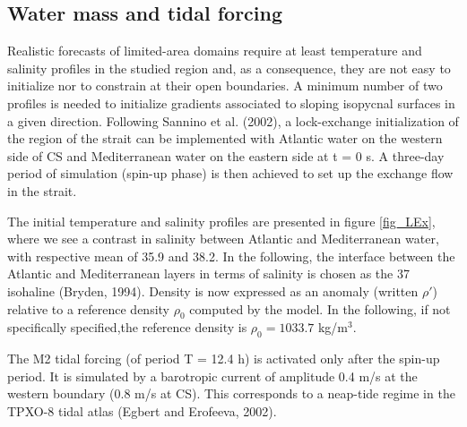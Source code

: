 \documentclass[a4paper,12pt]{article}
\begin{document}
\subsection{Water mass and tidal forcing}
\indent Realistic forecasts of limited-area domains require at least temperature and salinity profiles in the studied region and, as a consequence, they are not easy to initialize nor to constrain at their open boundaries. A minimum number of two profiles is needed to initialize gradients associated to sloping isopycnal surfaces in a given direction. Following Sannino et al. (2002), a lock-exchange initialization of the region of the strait can be implemented with Atlantic water on the western side of CS and Mediterranean water on the eastern side at t = 0 s. A three-day period of simulation (spin-up phase) is then achieved to set up the exchange flow in the strait.

The initial temperature and salinity profiles are presented in figure \ref{fig_LEx}, where we see a contrast in salinity between Atlantic and Mediterranean water, with respective mean of 35.9 and 38.2. In the following, the interface between the Atlantic and Mediterranean layers in terms of salinity is chosen as the 37 isohaline (Bryden, 1994). Density is now expressed as an anomaly (written $\rho'$) relative to a reference density $\rho_{0}$ computed by the model. In the following, if not specifically specified,the reference density is $\rho_{0}=1033.7$ kg/m$^3$.

The M2 tidal forcing (of period T = 12.4 h) is activated only after the spin-up period. It is simulated by a barotropic current of amplitude 0.4 m/s at the western boundary (0.8 m/s at CS). This corresponds to a neap-tide regime in the TPXO-8 tidal atlas (Egbert and Erofeeva, 2002).
\end{document}
